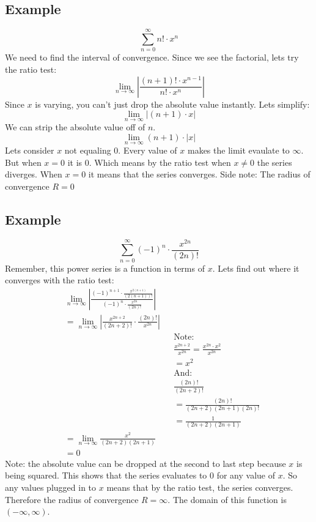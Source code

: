 \documentclass{report}
\begin{document}
    \subsection{Example}
        \[\sum_{n=0}^{\infty} n! \cdot x^n \]
        We need to find the interval of convergence.
        Since we see the factorial, lets try the ratio test:
        \[\lim_{n \to \infty} \left| \frac{(n+1)!\cdot x^{n-1}}{n! \cdot x^n}\right|\]
        Since \(x\) is varying, you can't just drop the absolute value instantly.
        Lets simplify:
        \[\lim_{n \to \infty} \left| (n+1) \cdot x\right|\]
        We can strip the absolute value off of \(n\).
        \[\lim_{n \to \infty} (n+1) \cdot |x| \]
        Lets consider \(x\) not equaling 0. 
        Every value of \(x\) makes the limit evaulate to \(\infty\).
        But when \(x = 0\) it is 0.
        Which means by the ratio test when \(x \neq 0\) the series diverges.
        When \(x = 0\) it means that the series converges.
        Side note: The radius of convergence \(R = 0\) 
    
    \subsection{Example}
        \[\sum_{n=0}^{\infty}  (-1)^n \cdot \frac{x^{2n}}{(2n)!}\]
        Remember, this power series is a function in terms of \(x\).
        Lets find out where it converges with the ratio test:
        \begin{align*}
            &\lim_{n \to \infty} \left| \frac{(-1)^{n+1} \cdot \frac{x^{2(n+1)}}{(2(n+1))!}}{(-1)^n \cdot \frac{x^{2n}}{(2n)!}}\right| \\
            &= \lim_{n \to \infty}  \left| \frac{x^{2n+2}}{(2n+2)!} \cdot \frac{(2n)!}{x^{2n}}\right| \\
            && & \text{Note:} \\
            && & \frac{x^{2n+2}}{x^{2n}} = \frac{x^{2n} \cdot x^2}{x^{2n}} \\
            && &= x^2 \\
            && & \text{And:} \\
            && & \frac{(2n)!}{(2n + 2)!} \\
            && &= \frac{(2n)!}{(2n+2)(2n+1)(2n)!} \\
            && &= \frac{1}{(2n+2)(2n+1)} \\
            &= \lim_{n \to \infty} \frac{x^2}{(2n+2)(2n+1)} \\
            &= 0
        \end{align*}
        Note: the absolute value can be dropped at the second to last step because \(x\) is being squared.
        This shows that the series evaluates to 0 for any value of \(x\).
        So any values plugged in to \(x\) means that by the ratio test, the series converges.
        Therefore the radius of convergence \(R = \infty\).
        The domain of this function is \((-\infty, \infty)\).
        
\end{document}
